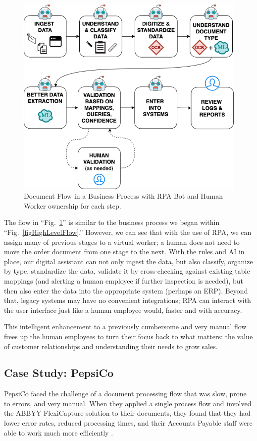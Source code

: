 \documentclass[conference, draftcls]{IEEEtran}
\begin{document}
\begin{figure}[ht]
\centerline{\includegraphics[width=\columnwidth]{BotFlow.png}}
\caption{Document Flow in a Business Process with RPA Bot and Human Worker ownership for each step.}
\label{figBotFlow}
\end{figure}

The flow in ``Fig.~\ref{figBotFlow}'' is similar to the business process we began within ``Fig.~\ref{figHighLevelFlow}.'' However, we can see that with the use of RPA, we can assign many of previous stages to a virtual worker; a human does not need to move the order document from one stage to the next. With the rules and AI in place, our digital assistant can not only ingest the data, but also classify, organize by type, standardize the data, validate it by cross-checking against existing table mappings (and alerting a human employee if further inspection is needed), but then also enter the data into the appropriate system (perhaps an ERP). Beyond that, legacy systems may have no convenient integrations; RPA can interact with the user interface just like a human employee would, faster and with accuracy.

This intelligent enhancement to a previously cumbersome and very manual flow frees up the human employees to turn their focus back to what matters: the value of customer relationships and understanding their needs to grow sales.

\subsection{Case Study: PepsiCo}
PepsiCo faced the challenge of a document processing flow that was slow, prone to errors, and very manual. When they applied a single process flow and involved the ABBYY FlexiCapture solution to their documents, they found that they had lower error rates, reduced processing times, and their Accounts Payable staff were able to work much more efficiently \cite{pepsico}.
\end{document}
